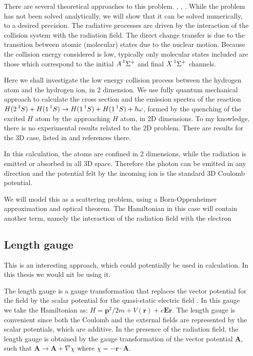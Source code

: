 There are several theoretical approaches to this problem. \cite{RadQuench1}, \cite{RadQuench2}, \cite{Zygelman88}. While the problem has not been solved analytically, we will show that it can be solved numerically, to a desired precision. The radiative processes are driven by the interaction of the collision system with the radiation field. The direct change transfer is due to the transition between atomic (molecular) states due to the nuclear motion. Because the collision energy considered is low, typically only molecular states included are those which correspond to the initial $ A \prescript{1}{}\Sigma^+ $  and final $ X \prescript{1}{}\Sigma^+ $ channels.

Here we shall investigate the low energy collision process between the hydrogen atom and the hydrogen ion, in 2 dimension. We use fully quantum mechanical approach to calculate the cross section and the emission spectra of the reaction $ H(2\prescript{2}{}S) + H(1\prescript{1}{}S)\rightarrow H(1\prescript{1}{}S) + H(1\prescript{1}{}S) + \hbar\omega $, formed by the quenching of the excited $ H $ atom by the approaching $ H $ atom, in 2D dimensions. To my knowledge, there is no experimental results related to the 2D problem. There are results for the 3D case, listed in \cite{Zygelman88} and references there.

In this calculation, the atoms are confined in 2 dimensions, while the radiation is emitted or absorbed in all 3D space. Therefore the photon can be emitted in any direction and the potential felt by the incoming ion is the standard 3D Coulomb potential.

We will model this as a scattering problem, using a Born-Oppenheimer approximation and optical theorem. The Hamiltonian in this case will contain another term, namely the interaction of the radiation field with the electron

\subsection*{Length gauge}


This is an interesting approach, which could potentially be used in calculation. In this thesis we would nit be using it.

The length gauge is a gauge transformation that replaces the vector potential for the field by the scalar potential for the quasi-static electric field \cite{LengthGauge3}.  In this gauge we take the Hamiltonian as: $ H = \mathbf{p}^2/2m + V(\mathbf{r})  + e\mathbf{E}\mathbf{r} $. The length gauge is convenient since both the Coulomb and the external fields are represented by the scalar potentials, which are additive. In the presence of the radiation field, the length gauge is obtained by the gauge transformation of the vector potential $ \mathbf{A} $, such that $ \mathbf{A} \rightarrow \mathbf{A} + \nabla \chi $ where $ \chi = - \mathbf{r} \cdot \mathbf{A} $. 

